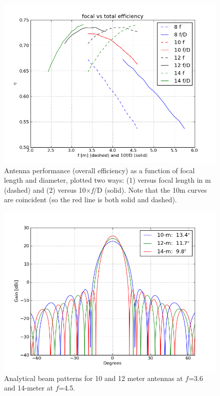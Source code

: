 \documentclass[11pt]{article}
\begin{document}
\begin{figure}[H]
\centering
\includegraphics[width=\textwidth]{plots/heraDishfDplot.png}
\caption{Antenna performance (overall efficiency) as a function of focal length and diameter, plotted two ways:  (1) versus focal length in m (dashed) and (2) versus 10$\times${\em f}/D (solid).  Note that the 10m curves are coincident (so the red line is both solid and dashed).}
\label{fig:heraDishfDplot}
\end{figure}

\begin{figure}[H]
\centering
\includegraphics[width=12cm]{plots/hera_10-12-14Beam.png}
\caption{Analytical beam patterns for 10 and 12 meter antennas at $f$=3.6 and 14-meter at $f$=4.5.}
\label{fig:HERA_10-12Beam}
\end{figure}
\end{document}
